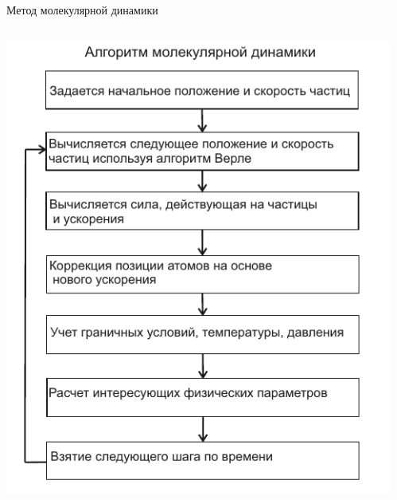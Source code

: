 \documentclass{beamer}
\begin{document}
\begin{frame}{Метод молекулярной динамики}
\footnotesize{

\begin{columns}
\begin{column}{0.4\linewidth}

\centering
    \includegraphics[width=\textwidth]{blocksheme}

\end{column}


\begin{column}{0.5\linewidth}


\end{column}
\end{columns}}
\end{frame}
\end{document}
